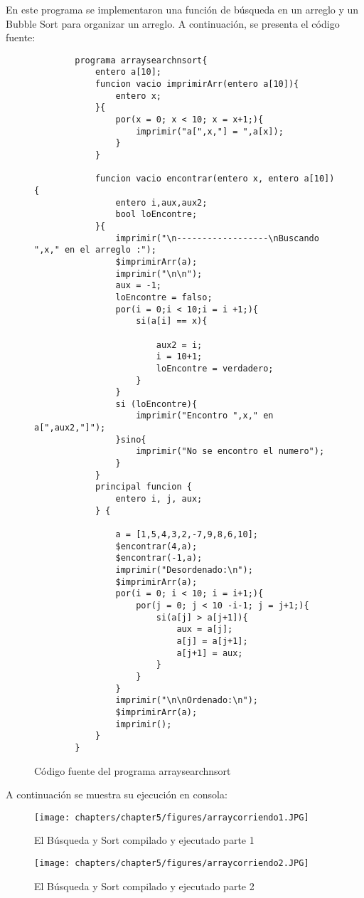 En este programa se implementaron una función de búsqueda en un arreglo y un Bubble Sort para organizar un arreglo.
A continuación, se presenta el código fuente:
\begin{figure}[htbp]
    \centering
    \tiny
    \begin{lstlisting}
        programa arraysearchnsort{
            entero a[10];
            funcion vacio imprimirArr(entero a[10]){
                entero x;
            }{
                por(x = 0; x < 10; x = x+1;){
                    imprimir("a[",x,"] = ",a[x]);
                }
            }
        
            funcion vacio encontrar(entero x, entero a[10]){
                entero i,aux,aux2;
                bool loEncontre;
            }{
                imprimir("\n------------------\nBuscando ",x," en el arreglo :");
                $imprimirArr(a);
                imprimir("\n\n");
                aux = -1;
                loEncontre = falso;
                por(i = 0;i < 10;i = i +1;){
                    si(a[i] == x){
                        
                        aux2 = i;
                        i = 10+1;
                        loEncontre = verdadero;
                    }
                }
                si (loEncontre){
                    imprimir("Encontro ",x," en a[",aux2,"]");
                }sino{
                    imprimir("No se encontro el numero");
                }
            }
            principal funcion {
                entero i, j, aux;
            } {
                
                a = [1,5,4,3,2,-7,9,8,6,10];
                $encontrar(4,a);
                $encontrar(-1,a);
                imprimir("Desordenado:\n");
                $imprimirArr(a);
                por(i = 0; i < 10; i = i+1;){
                    por(j = 0; j < 10 -i-1; j = j+1;){
                        si(a[j] > a[j+1]){
                            aux = a[j];
                            a[j] = a[j+1];
                            a[j+1] = aux;
                        }
                    }
                }
                imprimir("\n\nOrdenado:\n");
                $imprimirArr(a);
                imprimir();
            }
        }
    \end{lstlisting}
    \caption{Código fuente del programa arraysearchnsort}
    \label{fig:my_label}
\end{figure}
\FloatBarrier
A continuación se muestra su ejecución en consola:
\begin{figure}[htbp]
    \centering
    \texttt{[image: chapters/chapter5/figures/arraycorriendo1.JPG]}
    \caption{El Búsqueda y Sort compilado y ejecutado parte 1}
    \label{fig:my_label}
\end{figure}
\FloatBarrier
\begin{figure}[htbp]
    \centering
    \texttt{[image: chapters/chapter5/figures/arraycorriendo2.JPG]}
    \caption{El Búsqueda y Sort compilado y ejecutado parte 2}
    \label{fig:my_label}
\end{figure}
\FloatBarrier

